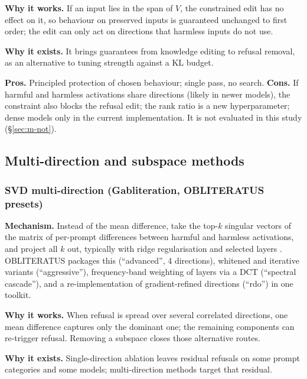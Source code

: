 \textbf{Why it works.} If an input lies in the span of $V$, the constrained
edit has no effect on it, so behaviour on preserved inputs is guaranteed
unchanged to first order; the edit can only act on directions that harmless
inputs do not use.

\textbf{Why it exists.} It brings guarantees from knowledge editing
\cite{meng2022locating,fang2025alphaedit} to refusal removal, as an
alternative to tuning strength against a KL budget.

\textbf{Pros.} Principled protection of chosen behaviour; single pass, no
search.
\textbf{Cons.} If harmful and harmless activations share directions (likely in
newer models), the constraint also blocks the refusal edit; the rank ratio is a
new hyperparameter; dense models only in the current implementation. It is not
evaluated in this study (\S\ref{sec:m-not}).

\subsection{Multi-direction and subspace methods}

\subsubsection{SVD multi-direction (Gabliteration, OBLITERATUS presets)}
\label{sec:m-svd}
\textbf{Mechanism.} Instead of the mean difference, take the top-$k$ singular
vectors of the matrix of per-prompt differences between harmful and harmless
activations, and project all $k$ out, typically with ridge regularisation and
selected layers \cite{gabliteration2024}. OBLITERATUS packages this
(``advanced'', 4 directions), whitened and iterative variants (``aggressive''),
frequency-band weighting of layers via a DCT (``spectral cascade''), and a
re-implementation of gradient-refined directions (``rdo'') in one toolkit.

\textbf{Why it works.} When refusal is spread over several correlated
directions, one mean difference captures only the dominant one; the remaining
components can re-trigger refusal. Removing a subspace closes those
alternative routes.

\textbf{Why it exists.} Single-direction ablation leaves residual refusals on
some prompt categories and some models; multi-direction methods target that
residual.

